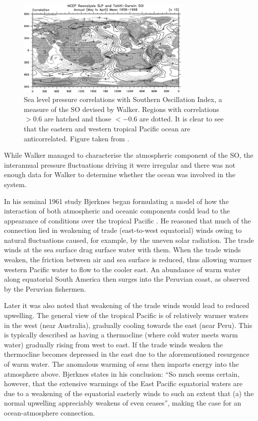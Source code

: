 \begin{figure}
  \centering
  \includegraphics[width=0.75\textwidth]{figures/slp_corr}
  \caption{Sea level pressure correlations with Southern Oscillation Index, a
    measure of the SO devised by Walker. Regions with correlations $>0.6$ are
    hatched and those $<-0.6$ are dotted. It is clear to see that the eastern
    and western tropical Pacific ocean are anticorrelated. Figure taken from
    \cite{trenberth2000}.
  }
  \label{fig:slp_corr}
\end{figure}

While Walker managed to characterise the atmospheric component of the SO, the
interannual pressure fluctuations driving it were irregular and there was not
enough data for Walker to determine whether the ocean was involved in the
system.

\vspace{0.5cm}

In his seminal 1961 study Bjerknes began formulating a model of how the
interaction of both atmospheric and oceanic components could lead to the
appearance of \elnino{} conditions over the tropical Pacific
\citep{bjerknes1961}. He reasoned that much of the connection lied in weakening
of trade (east-to-west equatorial) winds owing to natural fluctuations caused,
for example, by the uneven solar radiation. The trade winds at the sea surface
drag surface water with them. When the trade winds weaken, the friction between
air and sea surface is reduced, thus allowing warmer western Pacific water to
flow to the cooler east. An abundance of warm water along equatorial South
America then surges into the Peruvian coast, as observed by the Peruvian
fishermen.

Later \citep{bjerknes1966} it was also noted that weakening of the trade winds
would lead to reduced upwelling. The general view of the tropical Pacific is of
relatively warmer waters in the west (near Australia), gradually cooling towards
the east (near Peru). This is typically described as having a thermocline (where
cold water meets warm water) gradually rising from west to east. If the trade
winds weaken the thermocline becomes depressed in the east due to the
aforementioned resurgence of warm water. The anomalous warming of seas then
imparts energy into the atmosphere above. Bjerknes states in his conclusion:
``So much seems certain, however, that the extensive warmings of the East
Pacific equatorial waters are due to a weakening of the equatorial easterly
winds to such an extent that (a) the normal upwelling appreciably weakens of
even ceases'', making the case for an ocean-atmosphere connection.

